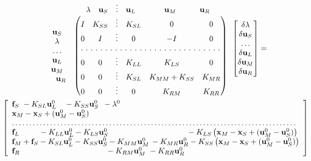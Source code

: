 \documentclass[11pt]{article}
\newcommand{\vecx}{{\bf x}}
\newcommand{\vecu}{{\bf u}}
\newcommand{\vecf}{{\bf f}}
\begin{document}
\begin{multline}
\label{eq:J_elimination}
\begin{array}{lc}  &  \begin{array}{cccccc} \!\!\!\!\lambda & \vecu_S & \vdots & \vecu_L \ \  \qquad & \vecu_M & \qquad \vecu_R \end{array}\\
\begin{matrix} \vecu_S  \\ \lambda \\ \dots\\ \vecu_L \\ \vecu_M \\  \quad \vecu_R\end{matrix} &
\begin{pmatrix}
  I & K_{SS} &\vdots & K_{SL} &  0 & 0\\
  0 & I     &\vdots &   0     & -I& 0\\
  \hdotsfor[2]{6}\\
  0 & 0     &\vdots &   K_{LL}&  K_{LS} & 0\\
  0 & 0     &\vdots &    K_{SL}   & K_{MM}+K_{SS}& K_{MR}\\
  0 & 0     &\vdots &    0   & K_{RM} & K_{RR}
\end{pmatrix}
\end{array}
\begin{bmatrix}
\delta \lambda\\ \delta \vecu_S \\ \dots \\ \delta \vecu_L \\ \delta \vecu_M \\ \delta \vecu_R
\end{bmatrix}
=\\
\left[\begin{array}{l}
\vecf_S \ - K_{SL} \vecu_L^0 \ \ \ - K_{SS} \vecu_S^0 \ \,- \lambda^0\\
\vecx_M - \vecx_S + (\vecu_M^0 - \vecu_S^0)\\
\dots\dots\dots\dots\dots\dots\dots\dots\dots\dots\dots\dots\dots\dots\dots\dots\dots\dots\dots\dots\dots\dots\dots\dots\dots\dots\dots.\\
\vecf_L \qquad \ \,- K_{LL} \vecu_L^0 - K_{LS} \vecu_S^0 \qquad \qquad \qquad \qquad \qquad - K_{LS}\left(\vecx_M - \vecx_S + (\vecu_M^0 - \vecu_S^0)\right)\\
\vecf_M + \vecf_S - K_{SL} \vecu_L^0 - K_{SS} \vecu_S^0 - K_{MM} \vecu_M^0 \, - K_{MR} \vecu_R^0  - K_{SS}\left(\vecx_M - \vecx_S + (\vecu_M^0 - \vecu_S^0)\right)\\
\vecf_R \qquad \qquad \qquad \qquad \qquad \quad - K_{RM} \vecu_M^0 \ - K_{RR} \vecu_R^0 \\
\end{array}\right]
\end{multline}
\end{document}
